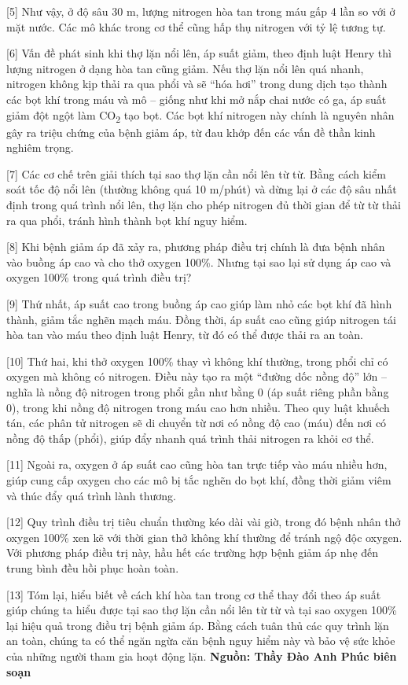 \documentclass[12pt,a4paper,twoside]{article}
\newenvironment{readingpassage}[1][]{%
    \begin{tcolorbox}[enhanced, colback=grayLight, colframe=secondaryBlue,
        coltitle=textDark, fonttitle=\bfseries, title={#1},
        rounded corners, arc=3mm, boxrule=1pt,
        left=15pt, right=15pt, top=10pt, bottom=10pt,
        breakable, before skip=10pt, after skip=10pt, drop fuzzy shadow]
    \setstretch{1.3}
}{\end{tcolorbox}}
\begin{document}
\begin{readingpassage}[]
[5] Như vậy, ở độ sâu 30 m, lượng nitrogen hòa tan trong máu gấp 4 lần so với ở mặt nước. Các mô khác trong cơ thể cũng hấp thụ nitrogen với tỷ lệ tương tự.

[6] Vấn đề phát sinh khi thợ lặn nổi lên, áp suất giảm, theo định luật Henry thì lượng nitrogen ở dạng hòa tan cũng giảm. Nếu thợ lặn nổi lên quá nhanh, nitrogen không kịp thải ra qua phổi và sẽ ``hóa hơi'' trong dung dịch tạo thành các bọt khí trong máu và mô -- giống như khi mở nắp chai nước có ga, áp suất giảm đột ngột làm CO\textsubscript{2} tạo bọt. Các bọt khí nitrogen này chính là nguyên nhân gây ra triệu chứng của bệnh giảm áp, từ đau khớp đến các vấn đề thần kinh nghiêm trọng.

[7] Các cơ chế trên giải thích tại sao thợ lặn cần nổi lên từ từ. Bằng cách kiểm soát tốc độ nổi lên (thường không quá 10 m/phút) và dừng lại ở các độ sâu nhất định trong quá trình nổi lên, thợ lặn cho phép nitrogen đủ thời gian để từ từ thải ra qua phổi, tránh hình thành bọt khí nguy hiểm.

[8] Khi bệnh giảm áp đã xảy ra, phương pháp điều trị chính là đưa bệnh nhân vào buồng áp cao và cho thở oxygen 100\%. Nhưng tại sao lại sử dụng áp cao và oxygen 100\% trong quá trình điều trị?

[9] Thứ nhất, áp suất cao trong buồng áp cao giúp làm nhỏ các bọt khí đã hình thành, giảm tắc nghẽn mạch máu. Đồng thời, áp suất cao cũng giúp nitrogen tái hòa tan vào máu theo định luật Henry, từ đó có thể được thải ra an toàn.

[10] Thứ hai, khi thở oxygen 100\% thay vì không khí thường, trong phổi chỉ có oxygen mà không có nitrogen. Điều này tạo ra một ``đường dốc nồng độ'' lớn -- nghĩa là nồng độ nitrogen trong phổi gần như bằng 0 (áp suất riêng phần bằng 0), trong khi nồng độ nitrogen trong máu cao hơn nhiều. Theo quy luật khuếch tán, các phân tử nitrogen sẽ di chuyển từ nơi có nồng độ cao (máu) đến nơi có nồng độ thấp (phổi), giúp đẩy nhanh quá trình thải nitrogen ra khỏi cơ thể.

[11] Ngoài ra, oxygen ở áp suất cao cũng hòa tan trực tiếp vào máu nhiều hơn, giúp cung cấp oxygen cho các mô bị tắc nghẽn do bọt khí, đồng thời giảm viêm và thúc đẩy quá trình lành thương.

[12] Quy trình điều trị tiêu chuẩn thường kéo dài vài giờ, trong đó bệnh nhân thở oxygen 100\% xen kẽ với thời gian thở không khí thường để tránh ngộ độc oxygen. Với phương pháp điều trị này, hầu hết các trường hợp bệnh giảm áp nhẹ đến trung bình đều hồi phục hoàn toàn.

[13] Tóm lại, hiểu biết về cách khí hòa tan trong cơ thể thay đổi theo áp suất giúp chúng ta hiểu được tại sao thợ lặn cần nổi lên từ từ và tại sao oxygen 100\% lại hiệu quả trong điều trị bệnh giảm áp. Bằng cách tuân thủ các quy trình lặn an toàn, chúng ta có thể ngăn ngừa căn bệnh nguy hiểm này và bảo vệ sức khỏe của những người tham gia hoạt động lặn.
\hfill\textbf{Nguồn: Thầy Đào Anh Phúc biên soạn}
\end{readingpassage}
\vspace{2pt}
\end{document}
